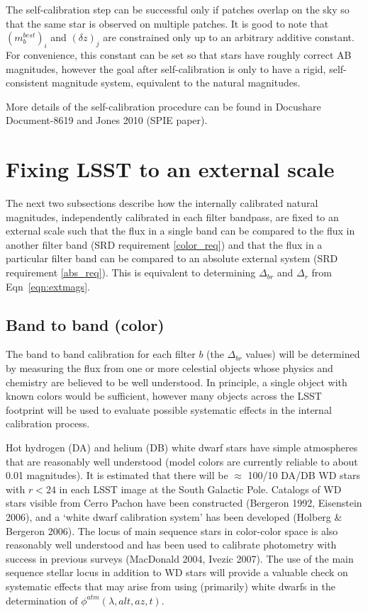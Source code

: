 \documentclass[12pt,preprint]{aastex}
\begin{document}
The self-calibration step can be successful only if patches
overlap on the sky so that the same star is observed on 
multiple patches. It is good to note that $(m_b^{best})_{i}$ and 
$(\delta z)_j$ are constrained only up to an arbitrary 
additive constant. For convenience, this constant can be set so that
stars have roughly correct AB magnitudes, however the goal after
self-calibration is only to have a rigid, self-consistent magnitude
system, equivalent to the natural magnitudes.

More details of the self-calibration procedure can be found in
Docushare Document-8619 and Jones 2010 (SPIE paper). 


\section{Fixing LSST to an external scale}
\label{sec:calib_external}

The next two subsections describe how the internally calibrated
natural magnitudes, independently calibrated in each filter bandpass, are fixed
to an external scale such that the flux in a single band can be compared to the
flux in another filter band (SRD requirement \ref{color_req}) and that
the flux in a particular filter band can be compared to an absolute
external system (SRD requirement \ref{abs_req}). This is equivalent to
determining $\Delta_{br}$ and $\Delta_r$ from Eqn~\ref{eqn:extmags}. 

\subsection{Band to band (color)}

The band to band calibration for each filter $b$ (the $\Delta_{br}$
values) will be determined by measuring the flux from one or more
celestial objects whose physics and chemistry are believed to be well
understood. In principle, a single object with known colors would be
sufficient, however many objects across the LSST footprint
will be used to evaluate possible systematic effects in the internal
calibration process. 

Hot hydrogen (DA) and helium (DB) white dwarf stars have simple
atmospheres that are reasonably well understood (model colors are
currently reliable to about 0.01 magnitudes). It is estimated that
there will be $\approx$ 100/10 DA/DB WD stars with $r<24$ in each LSST
image at the South Galactic Pole. Catalogs of WD stars visible from
Cerro Pachon have been constructed (Bergeron 1992, Eisenstein
2006), and a `white dwarf calibration system' has been developed
(Holberg \& Bergeron 2006). The locus of main sequence stars in
color-color space is also reasonably well understood and has been used
to calibrate photometry with success in previous surveys (MacDonald
2004, Ivezic 2007). The use of the main sequence stellar locus in addition to
WD stars will provide a valuable check on systematic effects that may
arise from using (primarily) white dwarfs in the determination of
$\phi^{atm}(\lambda,alt,az,t)$. 
\end{document}
